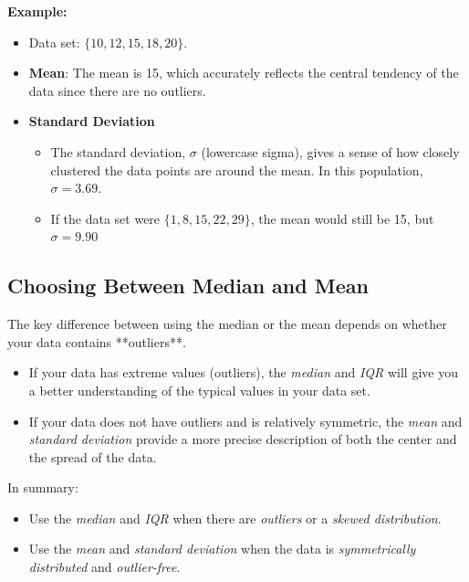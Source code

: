 \documentclass[12pt]{article}
\begin{document}
\textbf{Example:}

\begin{itemize}
  \item Data set: $\{10, 12, 15, 18, 20\}$.
  \item \textbf{Mean}: The mean is 15, which accurately reflects the central
        tendency of the data since there are no outliers.
  \item \textbf{Standard Deviation}
        \begin{itemize}
          \item The standard deviation, $\sigma$ (lowercase sigma), gives a
                sense of how closely clustered the data points are around the
                mean. In this population, $\sigma = 3.69$.
          \item If the data set were $\{1, 8, 15, 22, 29\}$, the mean would still
                be 15, but $\sigma = 9.90$
        \end{itemize}


\end{itemize}

\subsection{Choosing Between Median and Mean}

The key difference between using the median or the mean depends on whether your data contains **outliers**.

\begin{itemize}
  \item If your data has extreme values (outliers), the \emph{median} and
        \emph{IQR} will give you a better understanding of the typical values in
        your data set.
  \item If your data does not have outliers and is relatively symmetric, the
        \emph{mean} and \emph{standard deviation} provide a more precise
        description of both the center and the spread of the data.
\end{itemize}

In summary:
\begin{itemize}
  \item Use the \emph{median} and \emph{IQR} when there are \emph{outliers} or
        a \emph{skewed distribution}.
  \item Use the \emph{mean} and \emph{standard deviation} when the data is
        \emph{symmetrically distributed} and \emph{outlier-free}.
\end{itemize}
\end{document}
